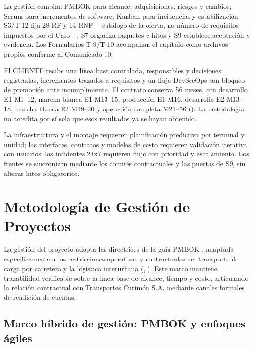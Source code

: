 \ProvideDocumentCommand{}
La gestión combina PMBOK para alcance, adquisiciones, riesgos y cambios; Scrum para incrementos de software; Kanban para incidencias y estabilización. S3/T-12 fija 28 RF y 14 RNF —catálogo de la oferta, no número de requisitos impuestos por el Caso—; S7 organiza paquetes e hitos y S9 establece aceptación y evidencia. Los Formularios T-9/T-10 acompañan el capítulo como archivos propios conforme al Comunicado 10.

El CLIENTE recibe una línea base controlada, responsables y decisiones registradas, incrementos trazados a requisitos y un flujo DevSecOps con bloqueo de promoción ante incumplimiento. El contrato conserva 56 meses, con desarrollo E1 M1–12, marcha blanca E1 M13–15, producción E1 M16, desarrollo E2 M13–18, marcha blanca E2 M19–20 y operación completa M21–56 (). La metodología no acredita por sí sola que esos resultados ya se hayan obtenido.

La infraestructura y el montaje requieren planificación predictiva por terminal y unidad; las interfaces, contratos y modelos de costo requieren validación iterativa con usuarios; los incidentes 24x7 requieren flujo con prioridad y escalamiento. Los frentes se sincronizan mediante los comités contractuales y las puertas de S9, sin alterar hitos obligatorios.

\section{Metodología de Gestión de Proyectos}\label{sec:6-gestion}\label{sec:06-metodologia-de-gestion-del-proyecto}

La gestión del proyecto adopta las directrices de la guía PMBOK \parencite{pmbok7}, adaptada específicamente a las restricciones operativas y contractuales del transporte de carga por carretera y la logística interurbana (, ). Este marco mantiene trazabilidad verificable sobre la línea base de alcance, tiempo y costo, articulando la relación contractual con Transportes Curimón S.A. mediante canales formales de rendición de cuentas.

\FloatBarrier
\subsection{Marco híbrido de gestión: PMBOK y enfoques ágiles}\label{sec:6-gestion-pmbok}\label{sec:06-marco-hibrido-de-gestion-pmbok-y-enfoques-agiles}

